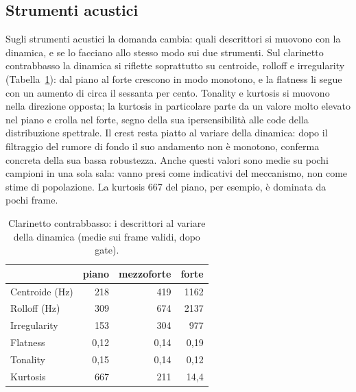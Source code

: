 \documentclass{article}
\begin{document}
\subsection{Strumenti acustici}\label{sec:strumenti}
Sugli strumenti acustici la domanda cambia: quali descrittori si muovono con la dinamica, e se lo facciano allo stesso modo sui due strumenti.
 Sul clarinetto contrabbasso la dinamica si riflette soprattutto su centroide, rolloff e irregularity (Tabella~\ref{tab:clarinetto}): dal piano al forte crescono in modo monotono, e la flatness li segue con un aumento di circa il sessanta per cento. Tonality e kurtosis si muovono nella direzione opposta; la kurtosis in particolare parte da un valore molto elevato nel piano e crolla nel forte, segno della sua ipersensibilità alle code della distribuzione spettrale. Il crest resta piatto al variare della dinamica: dopo il filtraggio del rumore di fondo il suo andamento non è monotono, conferma concreta della sua bassa robustezza. Anche questi valori sono medie su pochi campioni in una sola sala: vanno presi come indicativi del meccanismo, non come stime di popolazione. La kurtosis 667 del piano, per esempio, è dominata da pochi frame.

\begin{table}[t]
\centering
\small
\begin{tabular*}{\columnwidth}{@{\extracolsep{\fill}}lrrr@{}}
\toprule
 & piano & mezzoforte & forte \\
\midrule
Centroide (Hz) & 218  & 419  & 1162 \\
Rolloff (Hz)   & 309  & 674  & 2137 \\
Irregularity   & 153  & 304  & 977  \\
Flatness       & 0,12 & 0,14 & 0,19 \\
Tonality       & 0,15 & 0,14 & 0,12 \\
Kurtosis       & 667  & 211  & 14,4 \\
\bottomrule
\end{tabular*}
\caption{Clarinetto contrabbasso: i descrittori al variare della dinamica (medie sui frame validi, dopo gate).}
\label{tab:clarinetto}
\end{table}
\end{document}
